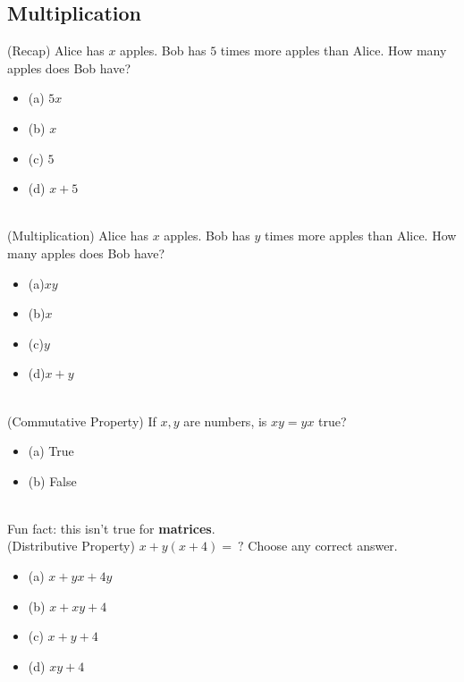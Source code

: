 \documentclass{article}
\begin{document}
\subsection{Multiplication}
(Recap) Alice has $x$ apples. Bob has $5$ times more apples than Alice. How many apples does Bob have? 
\begin{itemize}
\item[] (a) $5x$
\item[] (b) $x$
\item[] (c) $5$
\item[] (d) $x+5$
\end{itemize} \hrulefill \\[10pt]
(Multiplication) Alice has $x$ apples. Bob has $y$ times more apples than Alice. How many apples does Bob have? 
\begin{itemize}
\item[](a)$xy$
\item[](b)$x$
\item[](c)$y$
\item[](d)$x+y$
\end{itemize} \hrulefill \\[10pt]
(Commutative Property) If $x,y$ are numbers, is $xy = yx$ true? 
\begin{itemize}
\item[](a) True
\item[](b) False
\end{itemize} \hrulefill \\[10pt]
Fun fact: this isn't true for \textbf{matrices}.  \\[10pt]
(Distributive Property) $x+y(x+4) = \ ?$ Choose any correct answer.
\begin{itemize}
\item[](a) $x+yx+4y$
\item[](b) $x+xy+4$
\item[](c) $x+y+4$
\item[](d) $xy+4$
\end{itemize} \hrulefill \\[10pt]
\end{document}
